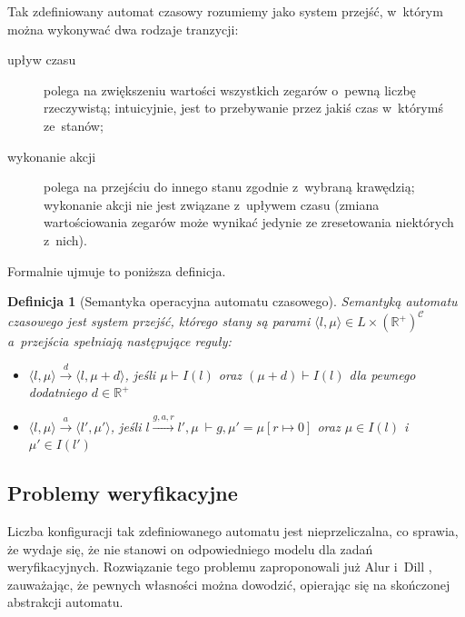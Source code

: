 \documentclass{pracamgr}
\newcommand{\pair}[2]{\langle #1, #2 \rangle}
\theoremstyle{plain}
\newtheorem{definition}{Definicja}
\begin{document}
Tak zdefiniowany automat czasowy rozumiemy jako
system przejść, w~którym można wykonywać dwa rodzaje tranzycji:
\begin{description}
  \item[upływ czasu] polega na zwiększeniu wartości wszystkich zegarów
  o~pewną liczbę rzeczywistą; intuicyjnie, jest to przebywanie przez
  jakiś czas w~którymś ze~stanów;
  \item[wykonanie akcji] polega na przejściu do innego stanu
  zgodnie z~wybraną krawędzią; wykonanie akcji nie jest związane
  z~upływem czasu (zmiana wartościowania zegarów może wynikać jedynie
  ze zresetowania niektórych z~nich).
\end{description}
Formalnie ujmuje to poniższa definicja.
\begin{definition}[Semantyka operacyjna automatu czasowego] Semantyką
  automatu czasowego jest system przejść, którego stany są parami
  $\pair{l}{\mu} \in L \times (\mathbb{R}^+)^{\mathcal{C}}$ a~przejścia
  spełniają następujące reguły:
  \begin{itemize}
    \item $\pair{l}{\mu} \stackrel{d}{\longrightarrow} \pair{l}{\mu+d}$,
    jeśli $\mu \vdash I(l)$ oraz $(\mu+d) \vdash I(l)$ dla pewnego
    dodatniego $d \in \mathbb{R}^{+}$
    \item $\pair{l}{\mu} \stackrel{a}{\longrightarrow} \pair{l'}{\mu'}$,
    jeśli $l \stackrel{g, a, r}{\longrightarrow} l', \mu~\vdash g, \mu' =
    \mu[r \mapsto 0]$ oraz $\mu \in I(l)$ i $\mu' \in I(l')$
  \end{itemize}
\end{definition}

\subsection{Problemy weryfikacyjne}

Liczba konfiguracji tak zdefiniowanego automatu jest nieprzeliczalna, co
sprawia, że wydaje się, że nie stanowi on odpowiedniego modelu dla zadań
weryfikacyjnych. Rozwiązanie tego problemu zaproponowali już Alur
i~Dill \cite{alur-dill}, zauważając, że pewnych własności można dowodzić,
opierając się na skończonej abstrakcji automatu.
\end{document}
